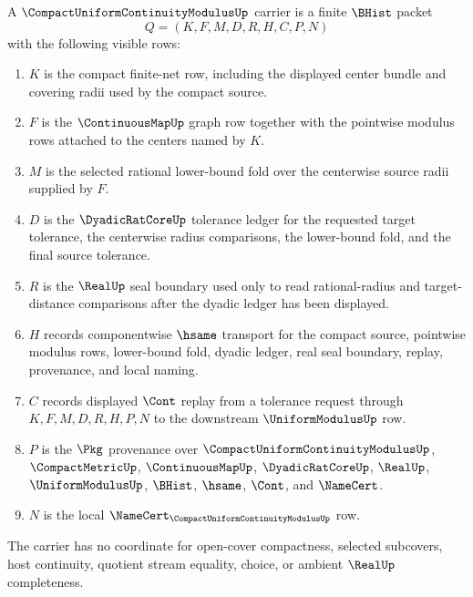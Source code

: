 \begin{definition}
\label{def:compact-uniform-continuity-modulus-carrier}
A $\CompactUniformContinuityModulusUp$ carrier is a finite $\BHist$ packet
$$
Q=(K,F,M,D,R,H,C,P,N)
$$
with the following visible rows:
\begin{enumerate}
\item $K$ is the compact finite-net row, including the displayed center bundle and covering radii used by the compact source.
\item $F$ is the $\ContinuousMapUp$ graph row together with the pointwise modulus rows attached to the centers named by $K$.
\item $M$ is the selected rational lower-bound fold over the centerwise source radii supplied by $F$.
\item $D$ is the $\DyadicRatCoreUp$ tolerance ledger for the requested target tolerance, the centerwise radius comparisons, the lower-bound fold, and the final source tolerance.
\item $R$ is the $\RealUp$ seal boundary used only to read rational-radius and target-distance comparisons after the dyadic ledger has been displayed.
\item $H$ records componentwise $\hsame$ transport for the compact source, pointwise modulus rows, lower-bound fold, dyadic ledger, real seal boundary, replay, provenance, and local naming.
\item $C$ records displayed $\Cont$ replay from a tolerance request through $K,F,M,D,R,H,P,N$ to the downstream $\UniformModulusUp$ row.
\item $P$ is the $\Pkg$ provenance over $\CompactUniformContinuityModulusUp$, $\CompactMetricUp$, $\ContinuousMapUp$, $\DyadicRatCoreUp$, $\RealUp$, $\UniformModulusUp$, $\BHist$, $\hsame$, $\Cont$, and $\NameCert$.
\item $N$ is the local $\NameCert_{\CompactUniformContinuityModulusUp}$ row.
\end{enumerate}
The carrier has no coordinate for open-cover compactness, selected subcovers, host continuity, quotient stream equality, choice, or ambient $\RealUp$ completeness.
\end{definition}

